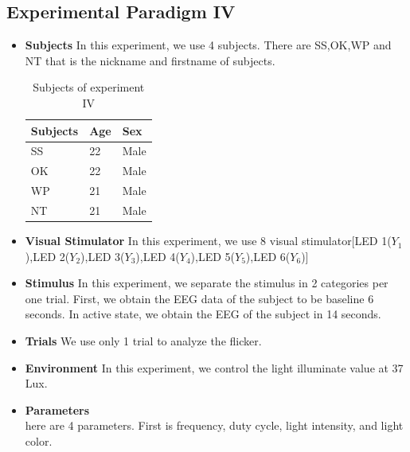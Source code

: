 \subsection{Experimental Paradigm IV}
\begin{itemize}
\item{\textbf{Subjects}}\newline
In this experiment, we use 4 subjects. There are SS,OK,WP and NT that is the nickname and firstname of subjects.


\begin{table}[ht]
\centering
\tabulinesep=1.5mm
\begin{tabu}{| P{.2\linewidth} | P{.2\linewidth} | P{.2\linewidth} |}
			\hline 
			\textbf{Subjects} & \textbf{Age}  & \textbf{Sex}\\
			\hline 
			SS & 22 & Male\\
			\hline 
			OK & 22 & Male\\
			\hline 
			WP & 21 & Male\\
			\hline 
			NT & 21 & Male\\
			\hline
		\end{tabu}       
\caption{Subjects of experiment IV}
\label{table:2}
\end{table}

\item{\textbf{Visual Stimulator}}
In this experiment, we use 8 visual stimulator[LED 1($Y_1$),LED 2($Y_2$),LED 3($Y_3$),LED 4($Y_4$),LED 5($Y_5$),LED 6($Y_6$)]
\item{\textbf{Stimulus}}
In this experiment, we separate the stimulus in 2 categories per one trial.
First, we obtain the EEG data of the subject to be baseline 6 seconds.
In active state, we obtain the EEG of the subject in 14 seconds.
\item{\textbf{Trials}}
We use only 1 trial to analyze the flicker.
\item{\textbf{Environment}}
In this experiment, we control the light illuminate value at 37 Lux.
\item{\textbf{Parameters}}\\
here are 4 parameters. First is frequency, duty cycle, light intensity, and light color.
\end{itemize}


